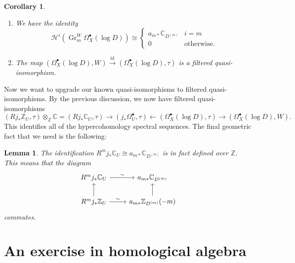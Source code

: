 \documentclass[leqno, openany]{memoir}
\newtheorem{cor}[thm]{Corollary}
\newtheorem{lem}[thm]{Lemma}
\theoremstyle{definition}
\theoremstyle{remark}
\theoremstyle{plain}
\theoremstyle{definition}
\theoremstyle{remark}
\newcommand{\C}{\mathbb{C}}
\newcommand{\Z}{\mathbb{Z}}
\newcommand{\mc}[1]{\mathcal{#1}}
\newcommand{\mr}[1]{\mathrm{#1}}
\newcommand{\on}[1]{\operatorname{#1}}
\begin{document}
\begin{cor}\leavevmode
    \begin{enumerate}
        \item We have the identity
            \[ \mc{H}^i(\on{Gr}_m^W \Omega_X^{\bullet}(\log D)) \cong \begin{cases}
                a_{m*} \C_{D^{(m)}} & i = m \\
                0 & \text{otherwise}.
            \end{cases}
            \]
        \item The map $(\Omega_X^{\bullet}(\log D), W) \xrightarrow{\mr{id}} (\Omega_X^{\bullet}(\log D), \tau)$ is a filtered quasi-isomorphism.
    \end{enumerate}
\end{cor}

Now we want to upgrade our known quasi-isomorphisms to filtered quasi-isomorphisms. By the previous discussion, we now have filtered quasi-isomorphisms
\[ (R j_* \Z_U, \tau) \otimes_{\Z} \C = (R j_* \C_U, \tau) \to (j_* \Omega_U^{\bullet}, \tau) \gets (\Omega_X^{\bullet}(\log D), \tau) \to (\Omega_X^{\bullet}(\log D), W). \]
This identifies all of the hypercohomology spectral sequences. The final geometric fact that we need is the following:

\begin{lem}
    The identification $R^m j_* \C_U \cong a_{m*} \C_{D^{(m)}}$ is in fact defined over $\Z$. This means that the diagram
    \begin{equation*}
    \begin{tikzcd}
        R^m j_* \C_U \ar{r}{\sim} & a_{m*} \C_{D^{(m)}} \\
        R^m j_* \Z_U \ar{r}{\sim} \ar{u} & a_{m*} \Z_{D^{(m)}}(-m) \ar{u}
    \end{tikzcd}
    \end{equation*}
    commutes.
\end{lem}

\section{An exercise in homological algebra}%
\label{sec:an_exercise_in_homological_algebra}
\end{document}
